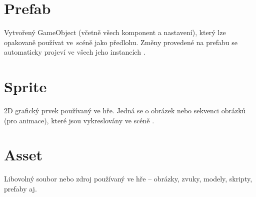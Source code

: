 \section{Prefab}
Vytvořený GameObject (včetně všech komponent a nastavení), který lze opakovaně používat ve~scéně jako předlohu. Změny provedené na prefabu se automaticky projeví ve všech jeho instancích \cite{unity-prefab}.

\section{Sprite}
2D grafický prvek používaný ve hře. Jedná se o obrázek nebo sekvenci obrázků (pro animace), které jsou vykreslovány ve scéně \cite{unity-sprite}.

\section{Asset}
Libovolný soubor nebo zdroj používaný ve hře -- obrázky, zvuky, modely, skripty, prefaby aj. \cite{unity-asset}